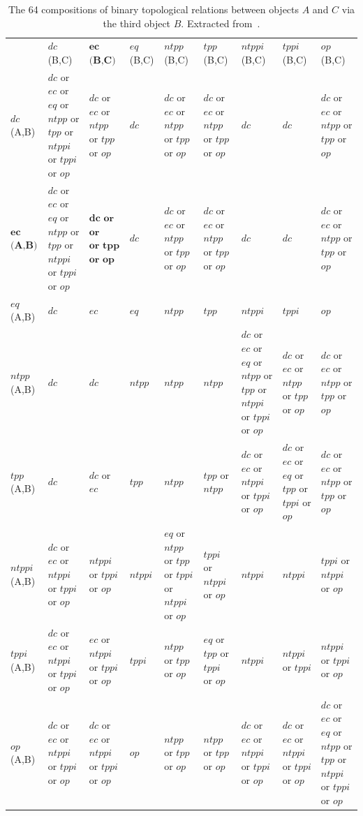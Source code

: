 \documentclass{article}
\begin{document}
 \begin{center}
 \begin{table}[H]
    \begin{tabular}{|p{1cm} || p{1.5cm} | p{1.5cm} | p{1.5cm} | p{1.5cm} | p{1.5cm} |p{1.5cm} |p{1.5cm}| p{1.5cm}| }
    \hline
      & $dc$ (B,C) & $\textbf{ec}$ $\textbf{(B,C)}$ & $eq$ (B,C) & $ntpp$  (B,C) & $tpp$ (B,C) &  $ntppi$ (B,C) & $tppi$ (B,C)& $op$ (B,C)\\ \hhline{|=|=|=|=|=|=|=|=|=|}
    $dc$ (A,B) & $dc$ or $ec$ or $eq$ or $ntpp$ or $tpp$ or $ntppi$ or $tppi$ or $op$  & $dc$ or $ec$ or $ntpp$ or $tpp$ or $op$ & $dc$ & $dc$ or $ec$ or $ntpp$ or $tpp$ or $op$ 
		& $dc$ or $ec$ or $ntpp$ or $tpp$ or $op$ & $dc$ &  $dc$ & $dc$ or $ec$ or $ntpp$ or $tpp$ or $op$ \\ \hline 
    $\textbf{ec}$ $\textbf{(A,B)}$ & $dc$ or $ec$ or $eq$ or $ntpp$ or $tpp$ or $ntppi$ or $tppi$ or $op$  & $\textbf{dc~or ec}$ $\textbf{or ntpp}$ $\textbf{or tpp}$ $\textbf{or op}$ & $dc$ 
    & $dc$ or $ec$ or $ntpp$ or $tpp$ or $op$ 	& $dc$ or $ec$ or $ntpp$ or $tpp$ or $op$ & $dc$ &  $dc$ & $dc$ or $ec$ or $ntpp$ or $tpp$ or $op$ \\ \hline 
    $eq$  (A,B) & $dc$ & $ec$ & $eq$ & $ntpp$ & $tpp$ & $ntppi$ & $tppi$ & $op$\\ \hline
    $ntpp$  (A,B)& $dc$ & $dc$ & $ntpp$ & $ntpp$ & $ntpp$ & $dc$ or $ec$ or $eq$ or $ntpp$ or $tpp$ or $ntppi$ or $tppi$ or $op$  & 
		  $dc$ or $ec$ or  $ntpp$ or $tpp$ or $op$& $dc$ or $ec$ or  $ntpp$ or $tpp$ or $op$\\ \hline
    $tpp$  (A,B)& $dc$ & $dc$ or $ec$  & $tpp$ & $ntpp$ & $tpp$ or $ntpp$ & $dc$ or $ec$ or $ntppi$ or $tppi$ or $op$ & $dc$ or $ec$ or $eq$ or $tpp$ or $tppi$ or $op$ &
		   $dc$ or $ec$ or $ntpp$ or $tpp$ or $op$ \\ \hline
    $ntppi$ (A,B)& $dc$ or $ec$ or $ntppi$ or $tppi$ or $op$ & $ntppi$ or $tppi$ or $op$  & $ntppi$ & $eq$ or $ntpp$ or $tpp$ or $tppi$ or $ntppi$ or $op$ &$tppi$ or $ntppi$ or $op$
		  & $ntppi$ &$ntppi$ & $tppi$ or $ntppi$ or $op$ \\ \hline
    $tppi$ (A,B)& $dc$ or $ec$ or $ntppi$ or $tppi$ or $op$  & $ec$ or $ntppi$ or $tppi$ or $op$ & $tppi$ & $ntpp$ or $tpp$ or $op$ & $eq$ or $tpp$ or $tppi$ or $op$ & $ntppi$  &
		  $ntppi$ or $tppi$ & $ntppi$ or $tppi$ or $op$\\ \hline
    $op$ (A,B)& $dc$ or $ec$ or $ntppi$ or $tppi$ or $op$ & $dc$ or $ec$ or $ntppi$ or $tppi$ or $op$ & $op$ & $ntpp$ or $tpp$ or $op$ & $ntpp$ or $tpp$ or $op$ &
		  $dc$ or $ec$ or $ntppi$ or $tppi$ or $op$  & $dc$ or $ec$ or $ntppi$ or $tppi$ or $op$ & $dc$ or $ec$ or $eq$ or $ntpp$ or $tpp$ or $ntppi$ or $tppi$ or $op$\\ \hline
    \end{tabular}
    \caption{The 64 compositions of binary topological relations between objects $A$ and $C$ via the third object $B$. Extracted from~\cite{egenhofer1991reasoning}.}
    \label{tab:comptable}
\end{table}
\end{center} 
\end{document}
